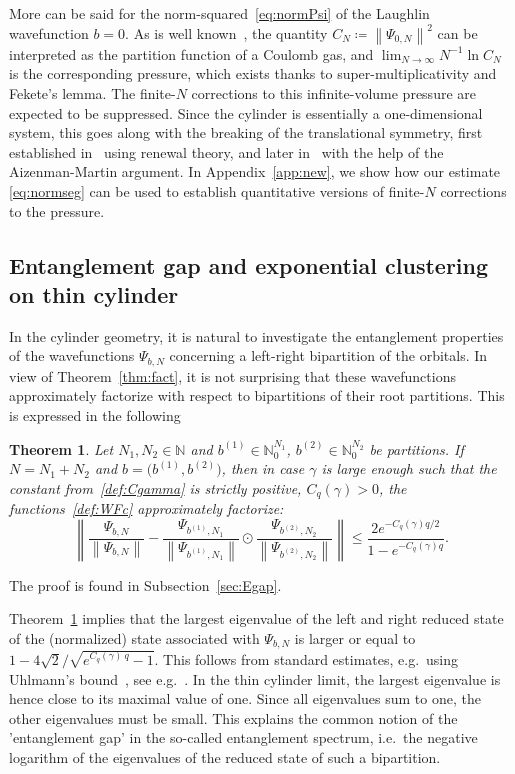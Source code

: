 \documentclass[letterpaper, DIV=17]{scrartcl}
\newtheorem{theorem}{Theorem}[section]  %
\numberwithin{equation}{section}
\theoremstyle{definition}
\begin{document}
More can be said for the norm-squared~\eqref{eq:normPsi}  of the Laughlin wavefunction $ b= 0 $. As is well known~\cite{di1994laughlin,jansen2009symmetry}, the quantity $ C_N \coloneqq \left\|  \Psi_{0,N}  \right\|^2 $ can be interpreted as the partition function of a Coulomb gas, and
$
\lim_{N\to \infty}N^{-1} \ln C_N
$ is the corresponding pressure, which exists thanks to super-multiplicativity and Fekete's lemma. The finite-$ N $ corrections to this infinite-volume pressure are expected to be suppressed. Since the cylinder is essentially a one-dimensional system, this goes along with the breaking of the translational symmetry, first established in~\cite{jansen2009symmetry} using renewal theory, and later in~\cite{Aizenman:2010aa} with the help of the Aizenman-Martin argument. In Appendix~\ref{app:new}, we show how our estimate \eqref{eq:normseg} can be used to establish quantitative versions of finite-$N$  corrections to the pressure. 
%
\subsection{Entanglement gap and exponential clustering on thin cylinder}

In the cylinder geometry, it is natural to investigate the entanglement properties of the wavefunctions $  \Psi_{b,N}  $ concerning a left-right bipartition of the orbitals. In view of Theorem~\ref{thm:fact}, 
it is not surprising that these wavefunctions approximately factorize with respect to bipartitions of their root partitions. This is expressed in the following 
%
\begin{theorem}\label{thm:EGap}
Let $ N_1 , N_2 \in \mathbb{N} $ and $ b^{(1)} \in \mathbb{N}_0^{N_1} $, $  b^{(2)} \in \mathbb{N}_0^{N_2} $ be partitions. If $ N = N_1 + N_2 $ and $ b= \big(b^{(1)}, b^{(2)} \big) $, then in case  $ \gamma $ is large enough such that the constant from~\eqref{def:Cgamma} is strictly positive, $ C_q(\gamma) > 0 $,   the functions~\eqref{def:WFc} approximately factorize: 
$$
\left\| \frac{\Psi_{b,N}}{\left\|\Psi_{b,N}\right\|}- \frac{ \Psi_{b^{(1)},N_1}  }{\left\| \Psi_{b^{(1)},N_1} \right\|}\odot  \frac{\Psi_{b^{(2)},N_2} }{\left\| \Psi_{b^{(2)},N_2} \right\|} \right\| \leq \frac{2 e^{-C_q(\gamma)q/2}}{1-e^{-C_q(\gamma)q}}  .
$$  
\end{theorem}
The proof is found in Subsection~\ref{sec:Egap}.

Theorem~\ref{thm:EGap} implies that the largest eigenvalue of the left and right reduced state of the (normalized) state associated with $ \Psi_{b,N}  $  is larger or equal to $ 1 -  4\sqrt{2}/ \sqrt{e^{C_q(\gamma)\ q } - 1}   $. This follows from standard estimates, e.g.\ using Uhlmann's bound~\cite{Uhlmann:1970aa}, see e.g.~\cite[Eq. (3.5)]{Aizenman:2025aa}.  In the thin cylinder limit, the largest eigenvalue is hence close to its maximal value of one. Since all eigenvalues sum to one, the other eigenvalues must be small.  This explains the common notion of the 'entanglement gap' in the so-called entanglement spectrum, i.e.\ the negative logarithm of the eigenvalues of the reduced state of such a bipartition.
\end{document}
